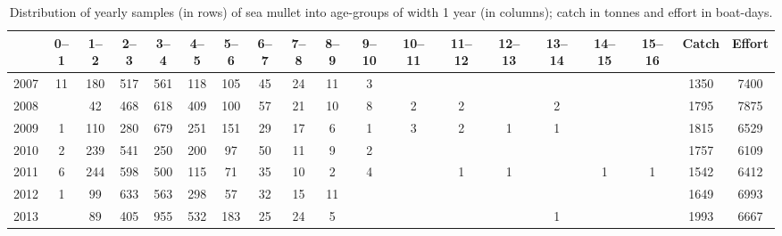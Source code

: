 \begin{sidewaystable}[ht]
\centering
\begin{tabular}{|l|c|c|c|c|c|c|c|c|c|c|c|c|c|c|c|c||c||c|}
  \hline
 & 0--1 & 1--2 & 2--3 & 3--4 & 4--5 & 5--6 & 6--7 & 7--8 & 8--9 & 9--10 & 10--11 & 11--12 & 12--13 & 13--14 & 14--15 & 15--16 & Catch & Effort \\ 
  \hline
2007 &  11 & 180 & 517 & 561 & 118 & 105 &  45 &  24 &  11 &   3 &  &  &  &  &  &  & 1350 & 7400 \\ 
  2008 &  &  42 & 468 & 618 & 409 & 100 &  57 &  21 &  10 &   8 &   2 &   2 &  &   2 &  &  & 1795 & 7875 \\ 
  2009 &   1 & 110 & 280 & 679 & 251 & 151 &  29 &  17 &   6 &   1 &   3 &   2 &   1 &   1 &  &  & 1815 & 6529 \\ 
  2010 &   2 & 239 & 541 & 250 & 200 &  97 &  50 &  11 &   9 &   2 &  &  &  &  &  &  & 1757 & 6109 \\ 
  2011 &   6 & 244 & 598 & 500 & 115 &  71 &  35 &  10 &   2 &   4 &  &   1 &   1 &  &   1 &   1 & 1542 & 6412 \\ 
  2012 &   1 &  99 & 633 & 563 & 298 &  57 &  32 &  15 &  11 &  &  &  &  &  &  &  & 1649 & 6993 \\ 
  2013 &  &  89 & 405 & 955 & 532 & 183 &  25 &  24 &   5 &  &  &  &  &   1 &  &  & 1993 & 6667 \\ 
   \hline
\end{tabular}
\caption{Distribution of yearly samples (in rows) of sea mullet into age-groups of width 1 year (in columns); catch in tonnes and effort in boat-days.} 
\label{tab:Mullet-NbAtAge}
\end{sidewaystable}
